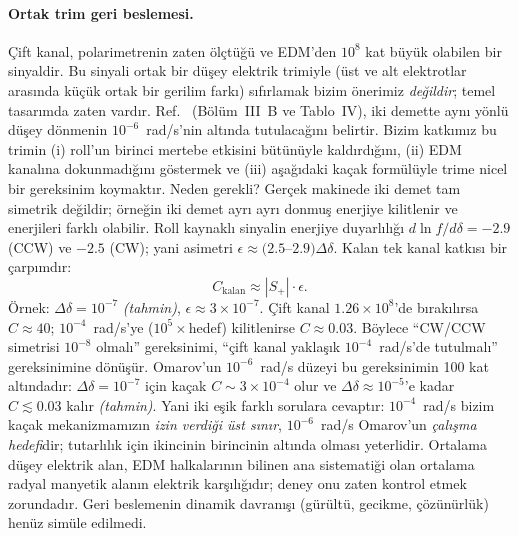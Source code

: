 \documentclass[12pt,a4paper]{extarticle}
\newcommand{\tahmin}{\textit{(tahmin)}}
\begin{document}
\paragraph{Ortak trim geri beslemesi.} Çift kanal, polarimetrenin zaten ölçtüğü ve EDM'den $10^8$ kat büyük
olabilen bir sinyaldir. Bu sinyali ortak bir düşey elektrik trimiyle (üst ve alt elektrotlar arasında küçük
ortak bir gerilim farkı) sıfırlamak bizim önerimiz \emph{değildir}; temel tasarımda zaten vardır.
Ref.~\cite{omarov} (Bölüm~III~B ve Tablo~IV), iki demette aynı yönlü düşey dönmenin $10^{-6}$~rad/s'nin altında
tutulacağını belirtir. Bizim katkımız bu trimin (i) roll'un birinci mertebe etkisini bütünüyle kaldırdığını,
(ii) EDM kanalına dokunmadığını göstermek ve (iii) aşağıdaki kaçak formülüyle trime nicel bir gereksinim
koymaktır. Neden gerekli? Gerçek
makinede iki demet tam simetrik değildir; örneğin iki demet ayrı ayrı donmuş enerjiye kilitlenir ve enerjileri
farklı olabilir. Roll kaynaklı sinyalin enerjiye duyarlılığı $d\ln f/d\delta=-2.9$ (CCW) ve $-2.5$ (CW); yani
asimetri $\epsilon\approx(2.5$--$2.9)\Delta\delta$. Kalan tek kanal katkısı bir çarpımdır:
\begin{equation}
C_\text{kalan}\approx|S_+|\cdot\epsilon.
\end{equation}
Örnek: $\Delta\delta=10^{-7}$ \tahmin, $\epsilon\approx3\times10^{-7}$. Çift kanal $1.26\times10^8$'de bırakılırsa
$C\approx40$; $10^{-4}$~rad/s'ye ($10^5\times$hedef) kilitlenirse $C\approx0.03$. Böylece ``CW/CCW simetrisi
$10^{-8}$ olmalı'' gereksinimi, ``çift kanal yaklaşık $10^{-4}$~rad/s'de tutulmalı'' gereksinimine dönüşür.
Omarov'un $10^{-6}$~rad/s düzeyi bu gereksinimin 100 kat altındadır: $\Delta\delta=10^{-7}$ için kaçak
$C\sim3\times10^{-4}$ olur ve $\Delta\delta\approx10^{-5}$'e kadar $C\lesssim0.03$ kalır \tahmin. Yani iki eşik
farklı sorulara cevaptır: $10^{-4}$~rad/s bizim kaçak mekanizmamızın \emph{izin verdiği üst sınır},
$10^{-6}$~rad/s Omarov'un \emph{çalışma hedefi}dir; tutarlılık için ikincinin birincinin altında olması
yeterlidir. Ortalama düşey elektrik alan, EDM halkalarının bilinen ana sistematiği olan ortalama
radyal manyetik alanın elektrik karşılığıdır; deney onu zaten kontrol etmek zorundadır. Geri beslemenin dinamik
davranışı (gürültü, gecikme, çözünürlük) henüz simüle edilmedi.
\end{document}
